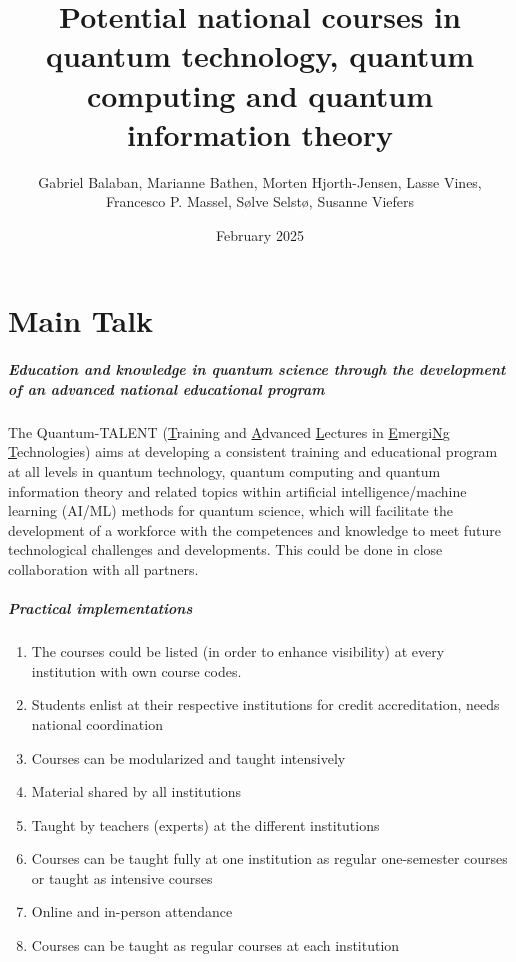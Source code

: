 \documentclass{beamer}
\title{Potential national courses in quantum technology, quantum computing and quantum information theory}
\author{Gabriel Balaban, Marianne Bathen, Morten Hjorth-Jensen, Lasse Vines, Francesco P. Massel, S\o lve Selst\o, Susanne Viefers}
\institute{Kristiania University College, OsloMet University, University of Oslo, University of South-Eastern Norway}
\date{February 2025}
\begin{document}
\frame{\titlepage}


\part<presentation>{Main Talk}


\begin{frame}
\frametitle{Education and knowledge in quantum science through the development of an advanced national educational program}

The Quantum-TALENT (\underline{T}raining and \underline{A}dvanced
\underline{L}ectures in \underline{E}mergi\underline{N}g
\underline{T}echnologies) aims at developing a consistent training and
educational program at all levels in quantum technology, quantum
computing and quantum information theory and related topics within  artificial
intelligence/machine learning (AI/ML) methods for quantum science,
which will facilitate the development of a workforce with the
competences and knowledge to meet future technological challenges and
developments. This could  be done in close collaboration with all
partners.
\end{frame}

\begin{frame}
\frametitle{Practical implementations}


\begin{block}{}
\begin{enumerate}
\item The courses could be listed (in order to enhance visibility) at every institution with own course codes.
\item Students enlist at their respective institutions for credit accreditation, needs national coordination
\item Courses can be modularized and taught intensively
\item Material shared by all institutions
\item Taught by teachers (experts) at the different institutions
\item Courses can be taught fully at one institution as regular one-semester courses or taught as intensive courses
\item Online and in-person attendance
\item Courses can be taught as regular courses at each institution
\end{enumerate}
\end{block}
\end{frame}
\end{document}
